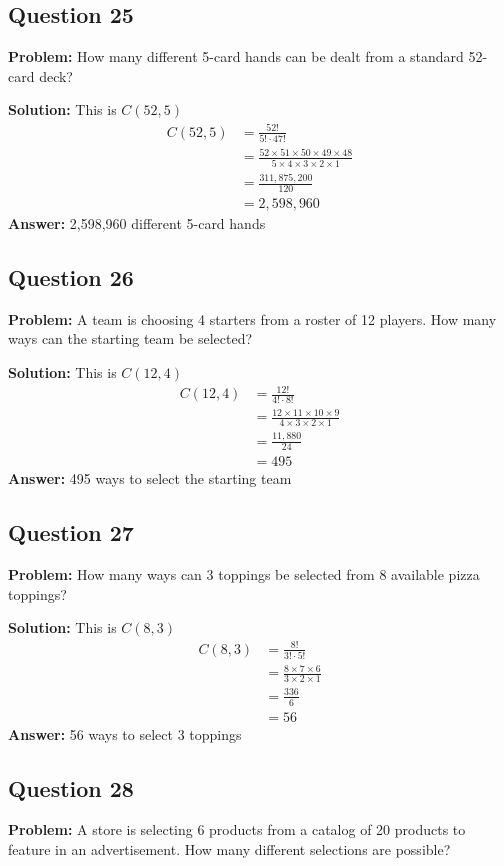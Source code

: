 \documentclass[12pt]{article}
\begin{document}
\subsection*{Question 25}
\textbf{Problem:} How many different 5-card hands can be dealt from a standard 52-card deck?

\textbf{Solution:} This is $C(52,5)$
\begin{align*}
C(52,5) &= \frac{52!}{5! \cdot 47!} \\
&= \frac{52 \times 51 \times 50 \times 49 \times 48}{5 \times 4 \times 3 \times 2 \times 1} \\
&= \frac{311{,}875{,}200}{120} \\
&= 2{,}598{,}960
\end{align*}
\textbf{Answer:} 2,598,960 different 5-card hands

\subsection*{Question 26}
\textbf{Problem:} A team is choosing 4 starters from a roster of 12 players. How many ways can the starting team be selected?

\textbf{Solution:} This is $C(12,4)$
\begin{align*}
C(12,4) &= \frac{12!}{4! \cdot 8!} \\
&= \frac{12 \times 11 \times 10 \times 9}{4 \times 3 \times 2 \times 1} \\
&= \frac{11{,}880}{24} \\
&= 495
\end{align*}
\textbf{Answer:} 495 ways to select the starting team

\subsection*{Question 27}
\textbf{Problem:} How many ways can 3 toppings be selected from 8 available pizza toppings?

\textbf{Solution:} This is $C(8,3)$
\begin{align*}
C(8,3) &= \frac{8!}{3! \cdot 5!} \\
&= \frac{8 \times 7 \times 6}{3 \times 2 \times 1} \\
&= \frac{336}{6} \\
&= 56
\end{align*}
\textbf{Answer:} 56 ways to select 3 toppings

\subsection*{Question 28}
\textbf{Problem:} A store is selecting 6 products from a catalog of 20 products to feature in an advertisement. How many different selections are possible?
\end{document}
